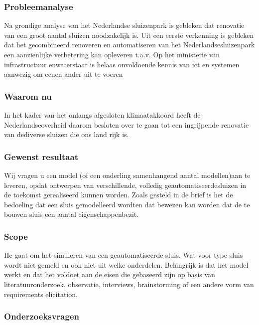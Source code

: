 \documentclass[11pt]{report} %
\begin{document}
\subsubsection{Probleemanalyse}

Na grondige analyse van het Nederlandse sluizenpark is gebleken dat renovatie van een groot aantal sluizen noodzakelijk is.  Uit een eerste verkenning is gebleken  dat het gecombineerd renoveren en automatiseren van het Nederlandsesluizenpark een aanzienlijke verbetering kan opleveren t.a.v. 
Op  het  ministerie  van  infrastructuur  enwaterstaat is helaas onvoldoende kennis van ict en systemen aanwezig om eenen ander uit te voeren 

\subsubsection{Waarom nu}
In  het  kader  van  het  onlangs  afgesloten  klimaatakkoord  heeft  de  Nederlandseoverheid  daarom  besloten  over  te  gaan  tot  een  ingrijpende  renovatie  van  dediverse  sluizen  die  ons  land  rijk  is.     

\subsubsection{Gewenst resultaat }

 
Wij vragen u een model (of een onderling samenhangend aantal modellen)aan  te  leveren,  opdat  ontwerpen  van  verschillende,  volledig  geautomatiseerdesluizen in de toekomst gerealiseerd kunnen worden. 
Zoals  gesteld  in  de  brief  is  het  de  bedoeling  dat  een  sluis  gemodelleerd  wordten  dat  bewezen  kan  worden  dat  de  te  bouwen  sluis  een  aantal  eigenschappenbezit.  
 
\subsubsection{Scope}
 
He gaat om het simuleren van een geautomatiseerde sluis. Wat voor type sluis wordt niet gemeld en ook niet uit welke onderdelen. Belangrijk is dat het model werkt en dat het voldoet aan de eisen die gebaseerd zijn op basis van literatuuronderzoek, observatie, interviews, brainstorming of een andere vorm van requirements elicitation.

\subsubsection{Onderzoeksvragen }
\end{document}
